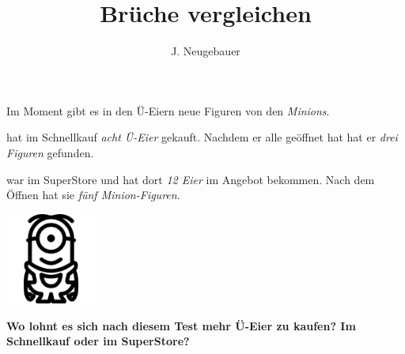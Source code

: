 \documentclass[13pt, a4paper]{scrartcl}
\author{J. Neugebauer}
\title{Brüche vergleichen}
\date{\Heute}
\begin{document}
\ReiheTitel

\bigskip
\begin{minipage}{0.79\textwidth}
	Im Moment gibt es in den Ü-Eiern neue Figuren von den \emph{Minions}.
	
	\medskip
	 hat im Schnellkauf \emph{acht Ü-Eier} gekauft. Nachdem er alle geöffnet hat hat er \emph{drei Figuren} gefunden.
	
	\medskip
	 war im SuperStore und hat dort \emph{12 Eier} im Angebot bekommen. Nach dem Öffnen hat sie \emph{fünf Minion-Figuren}.
\end{minipage} \hfill
\begin{minipage}{0.2\textwidth}
	\begin{center}
		\includegraphics[width=3cm]{6.3-Minion}
	\end{center}
\end{minipage}

\bigskip
\textbf{Wo lohnt es sich nach diesem Test mehr Ü-Eier zu kaufen? Im Schnellkauf oder im SuperStore?}
\end{document}
